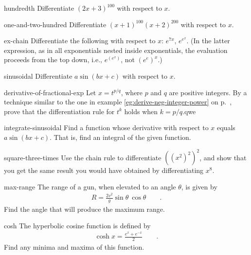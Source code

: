 \begin{hwsection}
\begin{hwwithsoln}{hundredth}
Differentiate  $(2x+3)^{100}$ with respect to $x$.
\end{hwwithsoln}

\begin{hwwithsoln}{one-and-two-hundred}
Differentiate  $(x+1)^{100}(x+2)^{200}$ with respect to $x$.
\end{hwwithsoln}

\begin{hwwithsoln}{ex-chain}
Differentiate  the following with respect to $x$: $e^{7x}$, $e^{e^x}$. (In the latter expression,
as in all exponentials nested inside exponentials, the evaluation proceeds from the top down, i.e.,
$e^{(e^x)}$, not $(e^e)^x$.)
\end{hwwithsoln}

\begin{hwwithsoln}{sinusoidal}
Differentiate $a\sin(bx+c)$ with respect to $x$.
\end{hwwithsoln}

\begin{hwwithsoln}{derivative-of-fractional-exp}
Let $x=t^{p/q}$, where $p$ and $q$ are positive integers. By a technique similar to the one
in example \ref{eg:derive-neg-integer-power} on p.~\pageref{eg:derive-neg-integer-power},
prove that the differentiation rule for $t^k$ holds when $k=p/q$.qwe
\end{hwwithsoln}

\begin{hwwithsoln}{integrate-sinusoidal}
Find a function whose derivative with respect to $x$ equals $a\sin(bx+c)$. That is, find an
integral of the given function.
\end{hwwithsoln}

\begin{hwwithsoln}{square-three-times}
Use the chain rule to differentiate $((x^2)^2)^2$, and show that you get the
same result you would have obtained by differentiating $x^8$.
\end{hwwithsoln}


\begin{hwwithsoln}{max-range}
The range of a gun, when elevated to an angle $\theta$, is given by
\begin{align*}
  R=\frac{2v^2}{g}\sin\theta\:\cos\theta \qquad .
\end{align*}
Find the angle that will produce the maximum range.
\end{hwwithsoln}

\begin{hwwithsoln}{cosh}
The hyperbolic cosine function is defined by
\begin{align*}
  \cosh x = \frac{e^x+e^{-x}}{2} \qquad .
\end{align*}
Find any minima and maxima of this function.
\end{hwwithsoln}


\end{hwsection}
